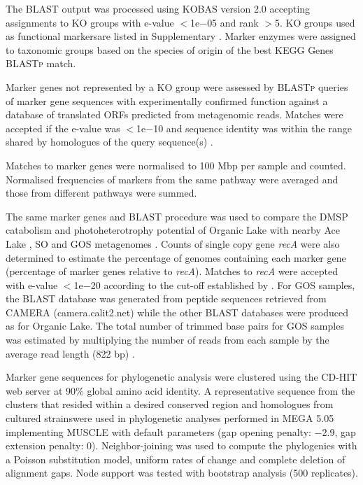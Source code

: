 The \ac{BLAST} output was processed using \ac{KOBAS} version 2.0 \cite{Xie2011} accepting assignments to \ac{KO} groups with e-value $<$1e$-$05 and rank $>$5. 
\ac{KO} groups used as functional markersare listed in Supplementary . 
Marker enzymes were assigned to taxonomic groups based on the species of origin of the best \ac{KEGG} Genes \textsc{BLASTp} match. 


Marker genes not represented by a \ac{KO} group were assessed by \textsc{BLASTp} queries of marker gene sequences with experimentally confirmed function  against a database of translated \acp{ORF} predicted from metagenomic reads. 
Matches were accepted if the e-value was $<$1e$-$10 and sequence identity was within the range shared by homologues of the query sequence(s) .

Matches to marker genes were normalised to 100 Mbp per sample and counted. 
Normalised frequencies of markers from the same pathway were averaged and those from different pathways were summed. 

The same marker genes and \ac{BLAST} procedure was used to compare the \ac{DMSP} catabolism and photoheterotrophy potential of Organic Lake with nearby Ace Lake \cite{Lauro2011}, \ac{SO} \cite{Wilkins2012b} and \ac{GOS} metagenomes \cite{Rusch2007}. 
Counts of single copy gene \emph{recA} were also determined to estimate the percentage of genomes containing each marker gene (percentage of marker genes relative to \emph{recA}). 
Matches to \emph{recA} were accepted with e-value $<$1e$-$20 according to the cut-off established by \citet{Howard2008}. 
For \ac{GOS} samples, the \ac{BLAST} database was generated from peptide sequences retrieved from \ac{CAMERA} (camera.calit2.net) while the other \ac{BLAST} databases were produced as for Organic Lake. 
The total number of trimmed base pairs for \ac{GOS} samples was estimated by multiplying the number of reads from each sample by the average read length (822 bp) \cite{Rusch2007}. 

Marker gene sequences for phylogenetic analysis were clustered using the \textsc{CD-HIT} web server \cite{Huang2010} at 90\% global amino acid identity. 
A representative sequence from the clusters that resided within a desired conserved region and homologues from cultured strainswere used in phylogenetic analyses performed in \ac{MEGA} 5.05 \cite{Tamura2011} implementing \textsc{MUSCLE} with default parameters (gap opening penalty: $-$2.9, gap extension penalty: 0). 
Neighbor-joining was used to compute the phylogenies with a Poisson substitution model, uniform rates of change and complete deletion of alignment gaps. 
Node support was tested with bootstrap analysis (500 replicates). 

